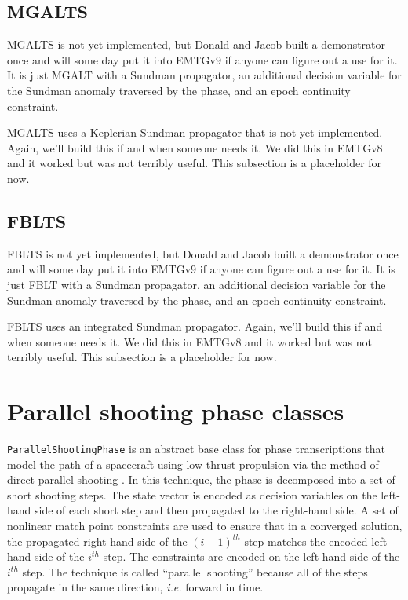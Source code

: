 \subsection{MGALTS}
\label{subsec:MGALTS}

\ac{MGALTS} is not yet implemented, but Donald and Jacob built a demonstrator once and will some day put it into EMTGv9 if anyone can figure out a use for it. It is just MGALT with a Sundman propagator, an additional decision variable for the Sundman anomaly traversed by the phase, and an epoch continuity constraint.

MGALTS uses a Keplerian Sundman propagator that is not yet implemented. Again, we'll build this if and when someone needs it. We did this in EMTGv8 and it worked but was not terribly useful. This subsection is a placeholder for now.

\subsection{FBLTS}
\label{subsec:FBLTS}

\ac{FBLTS} is not yet implemented, but Donald and Jacob built a demonstrator once and will some day put it into EMTGv9 if anyone can figure out a use for it. It is just FBLT with a Sundman propagator, an additional decision variable for the Sundman anomaly traversed by the phase, and an epoch continuity constraint.

FBLTS uses an integrated Sundman propagator. Again, we'll build this if and when someone needs it. We did this in EMTGv8 and it worked but was not terribly useful. This subsection is a placeholder for now.

\section{Parallel shooting phase classes}
\label{sec:parallel_shooting_phase}


\texttt{ParallelShootingPhase} is an abstract base class for phase transcriptions that model the path of a spacecraft using low-thrust propulsion via the method of direct parallel shooting \cite{enright1992}. In this technique, the phase is decomposed into a set of short shooting steps. The state vector is encoded as decision variables on the left-hand side of each short step and then propagated to the right-hand side. A set of nonlinear match point constraints are used to ensure that in a converged solution, the propagated right-hand side of the $(i-1)^{th}$ step matches the encoded left-hand side of the $i^{th}$ step. The constraints are encoded on the left-hand side of the $i^{th}$ step. The technique is called ``parallel shooting'' because all of the steps propagate in the same direction, \textit{i.e.} forward in time.

